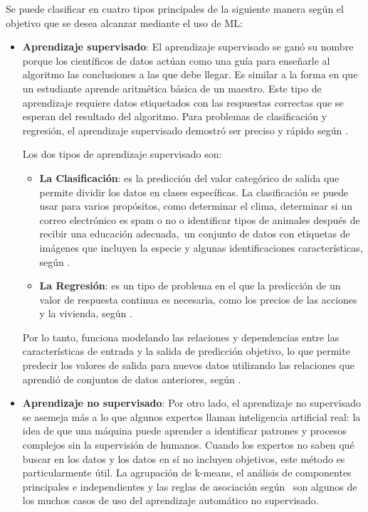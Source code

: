 Se puede clasificar en cuatro tipos principales de la siguiente manera según el objetivo que se desea alcanzar mediante el uso de ML:
\begin{itemize}
	\item \textbf{Aprendizaje supervisado}: El aprendizaje supervisado se ganó su nombre porque los científicos de datos actúan como una guía para enseñarle al algoritmo las conclusiones a las que debe llegar. Es similar a la forma en que un estudiante aprende aritmética básica de un maestro. Este tipo de aprendizaje requiere datos etiquetados con las respuestas correctas que se esperan del resultado del algoritmo. Para problemas de clasificación y regresión, el aprendizaje supervisado demostró ser preciso y rápido según \parencite{bk_zambrano2018supnosup}.
	
	Los dos tipos de aprendizaje supervisado son:

	\begin{itemize}
		\item \textbf{La Clasificación}: es la predicción del valor categórico de salida que permite dividir los datos en clases específicas. La clasificación se puede usar para varios propósitos, como determinar el clima, determinar si un correo electrónico es spam o no o identificar tipos de animales después de recibir una educación adecuada, un conjunto de datos con etiquetas de imágenes que incluyen la especie y algunas identificaciones características, según \parencite{bk_zambrano2018supnosup}.
		\item \textbf{La Regresión}: es un tipo de problema en el que la predicción de un valor de respuesta continua es necesaria, como los precios de las acciones y la vivienda, según \parencite{bk_zambrano2018supnosup}.
	\end{itemize}

	Por lo tanto, funciona modelando las relaciones y dependencias entre las características de entrada y la salida de predicción objetivo, lo que permite predecir los valores de salida para nuevos datos utilizando las relaciones que aprendió de conjuntos de datos anteriores, según \parencite{bk_alpaydin2014ml}.

	\item \textbf{Aprendizaje no supervisado}: Por otro lado, el aprendizaje no supervisado se asemeja más a lo que algunos expertos llaman inteligencia artificial real: la idea de que una máquina puede aprender a identificar patrones y procesos complejos sin la supervisión de humanos. Cuando los expertos no saben qué buscar en los datos y los datos en sí no incluyen objetivos, este método es particularmente útil. La agrupación de k-means, el análisis de componentes principales e independientes y las reglas de asociación según \parencite{bk_zambrano2018supnosup} son algunos de los muchos casos de uso del aprendizaje automático no supervisado.
	

\end{itemize}
